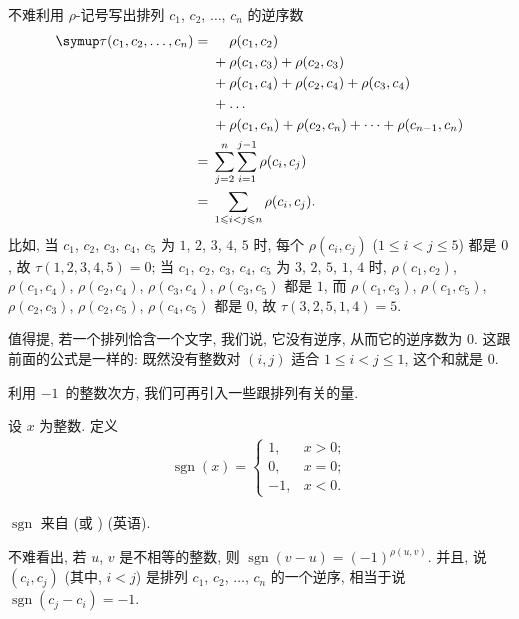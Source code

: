 \documentclass[../libro.tex]{subfiles}
\begin{document}
不难利用 \(\rho\)-记号写出排列
\(c_1\), \(c_2\), \(\dots\), \(c_n\)
的逆序数
\begin{align*}
    \tau(c_1, c_2, \dots, c_n)
    = {} & \hphantom{{} + {}} \rho(c_1, c_2)
    \\
    & + \rho(c_1, c_3) + \rho(c_2, c_3)
    \\
    & + \rho(c_1, c_4) + \rho(c_2, c_4) + \rho(c_3, c_4)
    \\
    & + \dots
    \\
    & + \rho(c_1, c_n) + \rho(c_2, c_n) + \dots + \rho(c_{n-1}, c_n)
    \\
    = {} &
    \sum_{j = 2}^{n} {\sum_{i = 1}^{j - 1} {\rho(c_i, c_j)}}
    \\
    = {} & \sum_{1 \leq i < j \leq n} {\rho(c_i, c_j)}.
\end{align*}
比如,
当 \(c_1\), \(c_2\), \(c_3\), \(c_4\), \(c_5\) 为
\(1\), \(2\), \(3\), \(4\), \(5\) 时,
每个 \(\rho(c_i, c_j)\)
(\(1 \leq i < j \leq 5\))
都是 \(0\),
故 \(\tau (1, 2, 3, 4, 5) = 0\);
当 \(c_1\), \(c_2\), \(c_3\), \(c_4\), \(c_5\) 为
\(3\), \(2\), \(5\), \(1\), \(4\) 时,
\(\rho(c_1, c_2)\), \(\rho(c_1, c_4)\),
\(\rho(c_2, c_4)\),
\(\rho(c_3, c_4)\), \(\rho(c_3, c_5)\)
都是 \(1\),
而
\(\rho(c_1, c_3)\), \(\rho(c_1, c_5)\),
\(\rho(c_2, c_3)\), \(\rho(c_2, c_5)\),
\(\rho(c_4, c_5)\)
都是 \(0\),
故 \(\tau (3, 2, 5, 1, 4) = 5\).

值得提,
若一个排列恰含一个文字, 我们说, 它没有逆序,
从而它的逆序数为 \(0\).
这跟前面的公式是一样的:
既然没有整数对 \((i, j)\) 适合 \(1 \leq i < j \leq 1\),
这个和就是 \(0\).

\vspace{2ex}

利用 \(-1\)~的整数次方,
我们可再引入一些跟排列有关的量.

\begin{definition}[符号记号]
    设 \(x\) 为整数.
    定义
    \begin{align*}
        \operatorname{sgn} {(x)} =
        \begin{cases}
            1,  & x > 0; \\
            0,  & x = 0; \\
            -1, & x < 0.
        \end{cases}
    \end{align*}
\end{definition}

\(\operatorname{sgn}\) 来自
 (或 ) (英语).

不难看出, 若 \(u\), \(v\) 是不相等的整数,
则 \(\operatorname{sgn} {(v - u)} = (-1)^{\rho(u, v)}\).
并且, 说 \((c_i, c_j)\) (其中, \(i < j\))
是排列
\(c_1\), \(c_2\), \(\dots\), \(c_n\)
的一个逆序,
相当于说
\(\operatorname{sgn} {(c_j - c_i)} = -1\).
\end{document}
